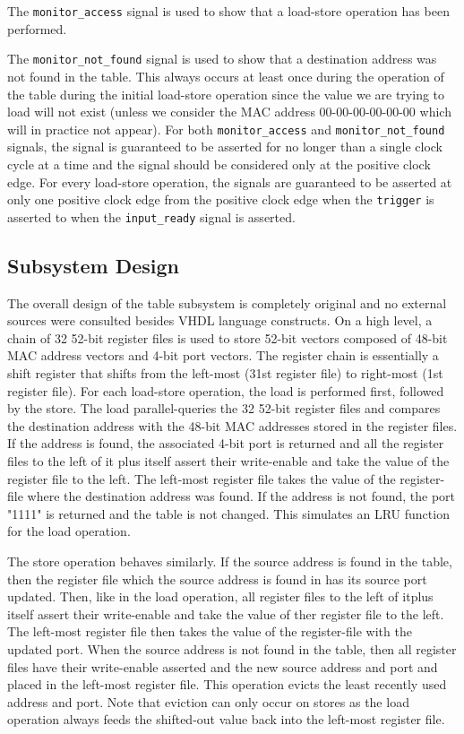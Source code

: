 \documentclass{article}
\begin{document}
The \texttt{monitor\_access} signal is used to show that a load-store operation has been performed. 

The \texttt{monitor\_not\_found} signal is used to show that a destination address was not found in the table. This always occurs at least once during the operation of the table during the initial load-store operation since the value we are trying to load will not exist (unless we consider the MAC address 00-00-00-00-00-00 which will in practice not appear). For both \texttt{monitor\_access} and \texttt{monitor\_not\_found} signals, the signal is guaranteed to be asserted for no longer than a single clock cycle at a time and the signal should be considered only at the positive clock edge. For every load-store operation, the signals are guaranteed to be asserted at only one positive clock edge from the positive clock edge when the \texttt{trigger} is asserted to when the \texttt{input\_ready} signal is asserted.

\newpage
\subsection{Subsystem Design}

The overall design of the table subsystem is completely original and no external sources were consulted besides VHDL language constructs. On a high level, a chain of 32 52-bit register files is used to store 52-bit vectors composed of 48-bit MAC address vectors and 4-bit port vectors. The register chain is essentially a shift register that shifts from the left-most (31st register file) to right-most (1st register file). For each load-store operation, the load is performed first, followed by the store. The load parallel-queries the 32 52-bit register files and compares the destination address with the 48-bit MAC addresses stored in the register files. If the address is found, the associated 4-bit port is returned and all the register files to the left of it plus itself assert their write-enable and take the value of the register file to the left. The left-most register file takes the value of the register-file where the destination address was found. If the address is not found, the port "1111" is returned and the table is not changed. This simulates an LRU function for the load operation. 

The store operation behaves similarly. If the source address is found in the table, then the register file which the source address is found in has its source port updated. Then, like in the load operation, all register files to the left of itplus itself assert their write-enable and take the value of ther register file to the left. The left-most register file then takes the value of the register-file with the updated port. When the source address is not found in the table, then all register files have their write-enable asserted and the new source address and port and placed in the left-most register file. This operation evicts the least recently used address and port. Note that eviction can only occur on stores as the load operation always feeds the shifted-out value back into the left-most register file.
\end{document}
